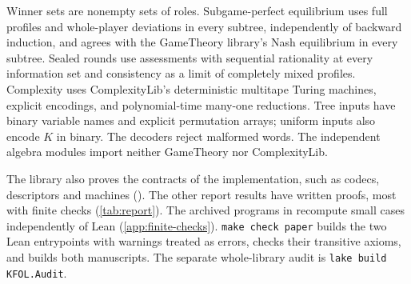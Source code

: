 Winner sets are nonempty sets of roles. Subgame-perfect equilibrium uses full profiles and whole-player deviations in every subtree, independently of backward induction, and agrees with the GameTheory library's Nash equilibrium in every subtree. Sealed rounds use assessments with sequential rationality at every information set and consistency as a limit of completely mixed profiles. Complexity uses ComplexityLib's deterministic multitape Turing machines, explicit encodings, and polynomial-time many-one reductions. Tree inputs have binary variable names and explicit permutation arrays; uniform inputs also encode $K$ in binary. The decoders reject malformed words. The independent algebra modules import neither GameTheory nor ComplexityLib.

The library also proves the contracts of the implementation, such as codecs, descriptors and machines (). The other report results have written proofs, most with finite checks (\cref{tab:report}). The archived programs in  recompute small cases independently of Lean (\cref{app:finite-checks}). \texttt{make check paper} builds the two Lean entrypoints with warnings treated as errors, checks their transitive axioms, and builds both manuscripts. The separate whole-library audit is \texttt{lake build KFOL.Audit}.

